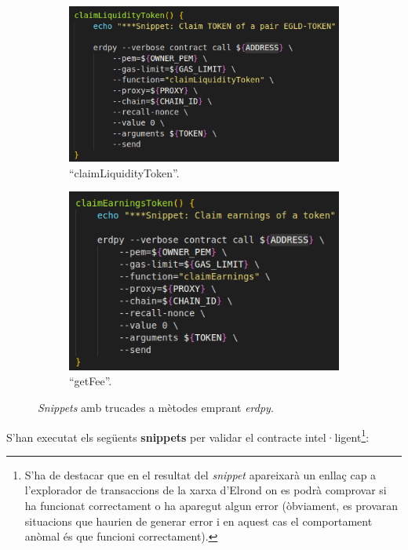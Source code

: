 \documentclass[11pt,a4paper]{article}
\begin{document}
\begin{figure}[!htb]
\begin{subfigure}[b]{0.46\textwidth}
	  \includegraphics[width=\linewidth]{test-liquiditytoken.png}
	  \caption{``claimLiquidityToken''.}\label{fig:test-liquiditytoken}
	\end{subfigure}\hfill
	\begin{subfigure}[b]{0.39\textwidth}
	  \includegraphics[width=\linewidth]{test-getearnings.png}
	  \caption{``getFee''.}\label{fig:test-getearnings}
	\end{subfigure}\hfill
	\caption{\textit{Snippets} amb trucades a mètodes emprant \textit{erdpy}.}
\end{figure}

S'han executat els següents \textbf{snippets} per validar el contracte intel·ligent\footnote{S'ha de destacar que en el resultat del \textit{snippet} apareixarà un enllaç cap a l'explorador de transaccions de la xarxa d'Elrond on es podrà comprovar si ha funcionat correctament o ha aparegut algun error (òbviament, es provaran situacions que haurien de generar error i en aquest cas el comportament anòmal és que funcioni correctament).}:
\end{document}
